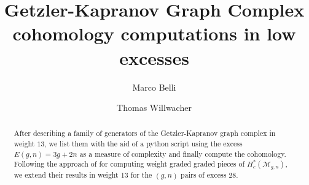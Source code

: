 \documentclass[12pt]{amsart}
\author{Marco Belli}
\author{Thomas Willwacher}
\title{Getzler-Kapranov Graph Complex cohomology computations in low excesses}
\theoremstyle{definition}
\numberwithin{equation}{section}
\newcommand{\M}{\mathcal{M}}
\theoremstyle{definition} %
\theoremstyle{remark}
\begin{document}
\begin{abstract}
    After describing a family of generators of the Getzler-Kapranov graph complex in weight $13$, we list them with the aid of a python script using the excess $E(g,n)=3g+2n$ as a measure of complexity and finally compute the cohomology. Following the approach of \cite{CLPW2} for computing weight graded graded pieces of $H^*_c(\M_{g,n})$, we extend their results in weight 13 for the $(g,n)$ pairs of excess $28$.
\end{abstract}

\maketitle


















%
\end{document}
